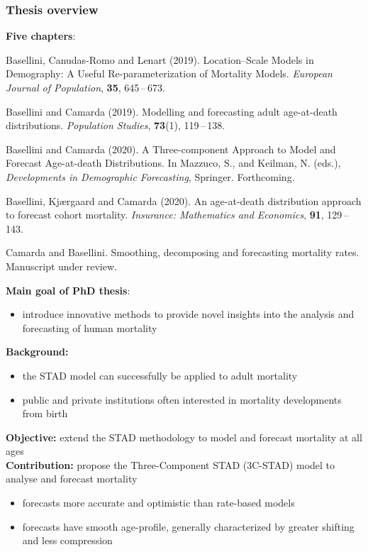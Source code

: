 \documentclass[12pt, xcolor=table]{beamer}  %
\begin{document}
\begin{frame}[plain]\frametitle{Thesis overview}
	\textbf{Five chapters}: 
	\begin{itemize}
		\scriptsize	
		\item { Basellini, Canudas-Romo and Lenart (2019). Location--Scale Models in Demography: A Useful Re-parameterization of Mortality Models. {\it European Journal of Population}, {\bf 35}, 645\,--\,673. 	
		
		\item   Basellini and Camarda (2019). Modelling and forecasting adult age-at-death distributions. {\it Population Studies}, {\bf 73}(1), 119\,--\,138. }
		
		\item  { Basellini and Camarda (2020). A Three-component Approach to Model and Forecast Age-at-death Distributions. In Mazzuco, S., and Keilman, N. (eds.), {\it Developments in Demographic Forecasting}, Springer. Forthcoming. }
			
		\item { Basellini, Kj{\ae}rgaard and Camarda (2020). An age-at-death distribution approach \\ to forecast cohort mortality. {\it Insurance: Mathematics and Economics}, {\bf 91}, 129\,--\,143.	
			
		\item Camarda and Basellini. Smoothing, decomposing and forecasting mortality rates. Manuscript under review. }	
	\end{itemize}
	\bigskip
	{\pgfsetfillopacity{1} 
		\textbf{Main goal of PhD thesis}: 
		\begin{itemize}
			\item introduce innovative methods to provide novel insights into the analysis and forecasting of human mortality	
		\end{itemize}
	}
\end{frame}


\begin{frame} %
	\textbf{Background:}
	\begin{itemize}
		\setlength\itemsep{0.5em}
		\item the STAD model can successfully be applied to adult mortality 
		\item public and private institutions often interested in mortality developments from birth
	\end{itemize}
	\bigskip \pause
	\textbf{Objective:} extend the STAD methodology to model and forecast mortality at all ages
	\\ \bigskip \pause
	\textbf{Contribution:} propose the Three-Component STAD (3C-STAD) model to analyse and forecast mortality
	\begin{itemize}
		\setlength\itemsep{0.5em}
		\item forecasts more accurate and optimistic than rate-based models 
		\item forecasts have smooth age-profile, generally characterized by greater shifting and less compression
	\end{itemize}
	
\end{frame}
\end{document}
